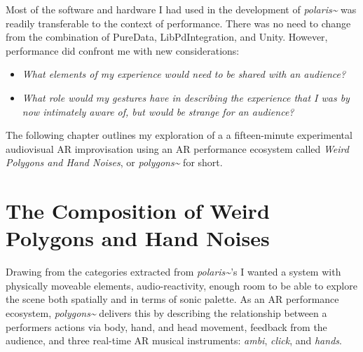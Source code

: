 Most of the software and hardware I had used in the development of \textit{polaris\textasciitilde{}} was readily transferable to the context of performance. There was no need to change from the combination of PureData, LibPdIntegration, and Unity. However, performance did confront me with new considerations: 
\begin{itemize}
    \item \textit{What elements of my experience would need to be shared with an audience?} 
    \item \textit{What role would my gestures have in describing the experience that I was by now intimately aware of, but would be strange for an audience?} 
\end{itemize}
The following chapter outlines my exploration of a a fifteen-minute experimental audiovisual AR improvisation using an AR performance ecosystem called \textit{Weird Polygons and Hand Noises}, or \textit{polygons\textasciitilde{}} for short.



\section{The Composition of Weird Polygons and Hand Noises} \label{sec: polygons-composition}

Drawing from the categories extracted from \textit{polaris\textasciitilde{}}'s I wanted a system with physically moveable elements, audio-reactivity, enough room to be able to explore the scene both spatially and in terms of sonic palette. As an AR performance ecosystem, \textit{polygons\textasciitilde{}} delivers this by describing the relationship between a performers actions via body, hand, and head movement, feedback from the audience, and three real-time AR musical instruments: \textit{ambi}, \textit{click}, and \textit{hands}. 

